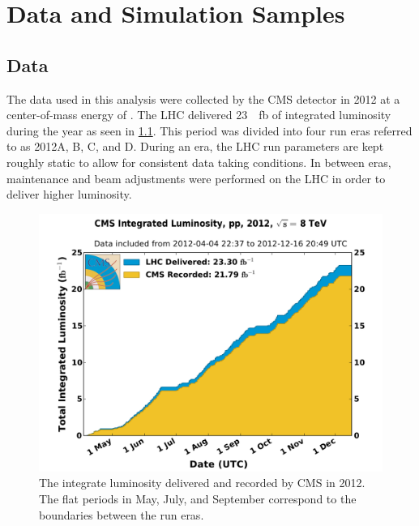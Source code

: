 \chapter{Data and Simulation Samples}
\label{chatper:data_and_mc_samples}

\section{Data}

The data used in this analysis were collected by the CMS detector in 2012 at a
center-of-mass energy of \rootseight. The LHC delivered
\SI{23}{\per\femto\barn} of integrated luminosity during the year as seen in
\cref{fig:2012_luminosity}. This period was divided into four run eras referred
to as 2012A, B, C, and D. During an era, the LHC run parameters are kept
roughly static to allow for consistent data taking conditions. In between eras,
maintenance and beam adjustments were performed on the LHC in order to deliver
higher luminosity.

\begin{figure}[!htbp]
    \centering
    \includegraphics[width=\textwidth]{figures/2012_lumi.pdf}
    \caption[
        The integrate luminosity delivered and recorded by CMS in 2012
    ]{
        The integrate luminosity delivered and recorded by CMS in 2012. The
        flat periods in May, July, and September correspond to the boundaries
        between the run eras.
    }
    \label{fig:2012_luminosity}
\end{figure}

